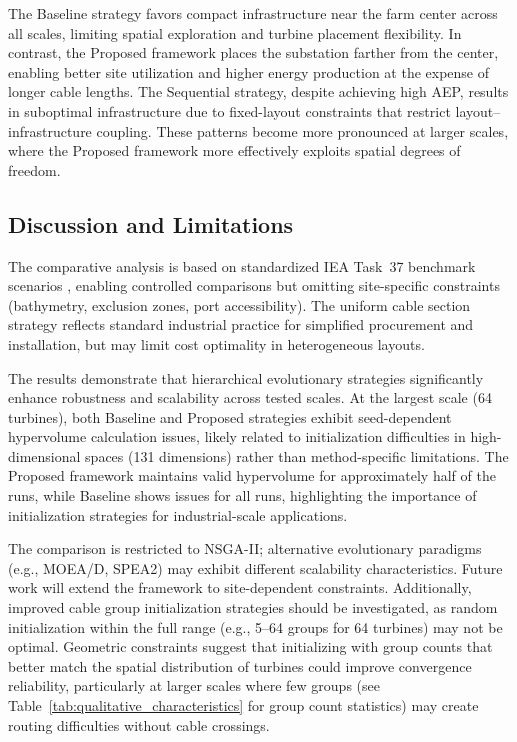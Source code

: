 \documentclass[format=sigconf,anonymous=true,review=true]{acmart}
\begin{document}
The Baseline strategy favors compact infrastructure near the farm center across all scales, limiting spatial exploration and turbine placement flexibility. In contrast, the Proposed framework places the substation farther from the center, enabling better site utilization and higher energy production at the expense of longer cable lengths. The Sequential strategy, despite achieving high AEP, results in suboptimal infrastructure due to fixed-layout constraints that restrict layout--infrastructure coupling. These patterns become more pronounced at larger scales, where the Proposed framework more effectively exploits spatial degrees of freedom.




\subsection{Discussion and Limitations}

The comparative analysis is based on standardized IEA Task~37 benchmark scenarios \cite{Baker2019Best}, enabling controlled comparisons but omitting site-specific constraints (bathymetry, exclusion zones, port accessibility). The uniform cable section strategy reflects standard industrial practice for simplified procurement and installation, but may limit cost optimality in heterogeneous layouts.

The results demonstrate that hierarchical evolutionary strategies significantly enhance robustness and scalability across tested scales. At the largest scale (64 turbines), both Baseline and Proposed strategies exhibit seed-dependent hypervolume calculation issues, likely related to initialization difficulties in high-dimensional spaces (131 dimensions) rather than method-specific limitations. The Proposed framework maintains valid hypervolume for approximately half of the runs, while Baseline shows issues for all runs, highlighting the importance of initialization strategies for industrial-scale applications.

The comparison is restricted to NSGA-II; alternative evolutionary paradigms (e.g., MOEA/D, SPEA2) may exhibit different scalability characteristics. Future work will extend the framework to site-dependent constraints. Additionally, improved cable group initialization strategies should be investigated, as random initialization within the full range (e.g., 5--64 groups for 64 turbines) may not be optimal. Geometric constraints suggest that initializing with group counts that better match the spatial distribution of turbines could improve convergence reliability, particularly at larger scales where few groups (see Table~\ref{tab:qualitative_characteristics} for group count statistics) may create routing difficulties without cable crossings.
\end{document}
